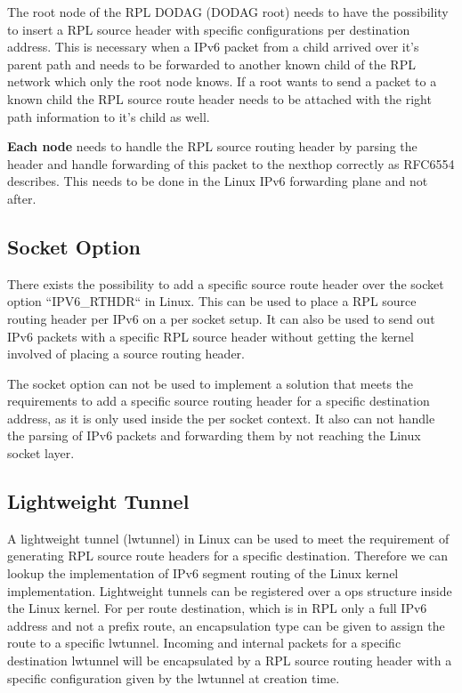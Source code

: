 \documentclass[letterpaper]{article}
\begin{document}
The root node of the RPL DODAG (DODAG root) needs to have the possibility to insert a RPL source header with specific configurations per destination address.
This is necessary when a IPv6 packet from a child arrived over it's parent path
and needs to be forwarded to another known child of the RPL network which only the root node knows.
If a root wants to send a packet to a known child the RPL source route header
needs to be attached with the right path information to it's child as well.

{\bf Each node} needs to handle the RPL source routing header by parsing the header and handle forwarding of this packet to the nexthop correctly as RFC6554 describes.
This needs to be done in the Linux IPv6 forwarding plane and not after.

\subsection{Socket Option}

There exists the possibility to add a specific source route header over the socket option ``IPV6\_RTHDR`` in Linux.
This can be used to place a RPL source routing header per IPv6 on a per socket setup.
It can also be used to send out IPv6 packets with a specific RPL source header without getting the kernel involved of placing a source routing header.

The socket option can not be used to implement a solution that meets the
requirements to add a specific source routing header for a specific destination
address, as it is only used inside the per socket context.
It also can not handle the parsing of IPv6 packets and forwarding them by not reaching the Linux socket layer.

\subsection{Lightweight Tunnel}

A lightweight tunnel (lwtunnel) in Linux can be used to meet the requirement of
generating RPL source route headers for a specific destination.
Therefore we can lookup the implementation of IPv6 segment routing \cite{srh} of the Linux kernel implementation.
Lightweight tunnels can be registered over a ops structure inside the Linux kernel.
For per route destination, which is in RPL only a full IPv6 address and not a prefix
route, an encapsulation type can be given to assign the route to a specific lwtunnel.
Incoming and internal packets for a specific destination lwtunnel will be encapsulated by a RPL source routing header with a specific configuration given by the lwtunnel at creation time.
\end{document}
